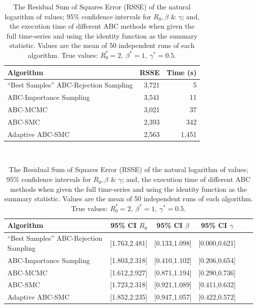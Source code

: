 \documentclass[11pt,a4paper]{article}
\theoremstyle{break}
\begin{document}
  \begin{table}[H]
    \begin{tabular}{|l|r|r|}
      \hline
      \textbf{Algorithm}&\textbf{RSSE}&\textbf{Time (s)}\\\hline\hline
      ``Best Samples'' ABC-Rejection Sampling&3,721&5\\\hline
      ABC-Importance Sampling&3,541&11\\\hline
      ABC-MCMC&3,021&37\\\hline
      ABC-SMC&2,393&342\\\hline
      Adaptive ABC-SMC&2,563&1,451\\\hline
    \end{tabular}\\
    \bigskip
    \begin{tabular}{|l|r|c|c|c|r|}
      \hline
      \textbf{Algorithm}&\textbf{95\% CI $R_0$}&\textbf{95\% CI $\beta$}&\textbf{95\% CI $\gamma$}\\\hline\hline
      ``Best Samples'' ABC-Rejection Sampling&[1.763,2.481]&[0.133,1.098]&[0.000,0.621]\\\hline
      ABC-Importance Sampling&[1.803,2.318]&[0.410,1.102]&[0.206,0.654]\\\hline
      ABC-MCMC&[1.612,2.927]&[0.871,1.194]&[0.290,0.736]\\\hline
      ABC-SMC&[1.723,2.318]&[0.921,1.089]&[0.411,0.632]\\\hline
      Adaptive ABC-SMC&[1.852,2.235]&[0.947,1.057]&[0.422,0.572]\\\hline
    \end{tabular}
    \caption{The Residual Sum of Squares Error (RSSE) of the natural logarithm of values; 95\% confidence intervals for $R_0,\beta$ \& $\gamma$; and, the execution time of different ABC methods when given the full time-series and using the identity function as the summary statistic. Values are the mean of 50 independent runs of each algorithm. True values: $R_0^*=2,\ \beta^*=1,\ \gamma^*=0.5$.}
    \label{table_abc_methods_on_sir_model}
  \end{table}
\end{document}
